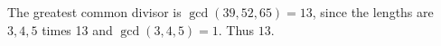 The greatest common divisor is $\gcd(39,52,65)=13$, since the lengths are $3,4,5$ times 13 and $\gcd(3,4,5)=1$. Thus $\boxed{13}$.
